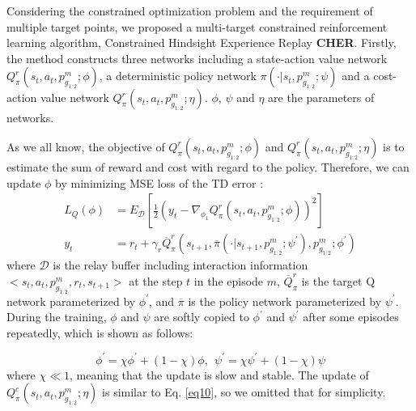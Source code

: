 \documentclass{article}
\begin{document}
Considering the constrained optimization problem and the requirement of multiple target points, we proposed a multi-target constrained reinforcement learning algorithm, Constrained Hindsight Experience Replay \textbf{CHER}. Firstly, the method constructs three networks including a state-action value network $Q^r_\pi(s_t,a_t, p^m_{g_{1:2}};\phi)$, a deterministic policy network $ \pi(\cdot|s_t,p^m_{g_{1:2}};\psi)$ and a cost-action value network $Q^r_\pi(s_t,a_t,p^m_{g_{1:2}};\eta)$. $\phi$, $\psi$  and $\eta$ are the parameters of networks. 

As we all know, the objective of  $Q^r_\pi(s_t,a_t,p^m_{g_{1:2}};\phi)$ and $Q^r_\pi(s_t,a_t,p^m_{g_{1:2}};\eta)$ is to estimate the sum of reward and cost with regard to the policy. Therefore, we can update $\phi$ by minimizing MSE loss of the TD error \cite{lillicrap2015continuous}: 
\begin{equation}
  \label{eq10}
\begin{split}
L_Q(\phi) &= E_{\mathcal D}[\frac{1}{2}(y_t-\nabla_{\phi_1}Q^r_\pi(s_t,a_t,p^m_{g_{1:2}};\phi))^2]\\
y_t &= r_t +\gamma_r \overline{Q}^r_\pi(s_{t+1},\overline{\pi}(\cdot|s_{t+1},p^m_{g_{1:2}};\psi^{\prime}),p^m_{g_{1:2}};\phi^{\prime})
\end{split}
\end{equation}
where $\mathcal D$ is the relay buffer including interaction information $<s_t,a_t,p^m_{g_{1:2}},r_t,s_{t+1}>$ at the step $t$ in the episode $m$,  $\overline{Q}^r_\pi$ is the target Q network parameterized by $\phi^\prime$, and $\overline{\pi}$ is the policy network parameterized by $\psi^\prime$. During the training, $\phi$ and $\psi$ are softly copied to $\phi^\prime$ and $\psi^\prime$ after some episodes repeatedly, which is shown as follows:

\begin{equation}
  \label{eq10-2}
\phi^\prime=\chi\phi^\prime+\left(1-\chi\right)\phi , \ \ \psi^\prime=\chi\psi^\prime+\left(1-\chi\right)\psi
\end{equation}
where $\chi \ll 1$, meaning that the update is slow and stable. The update of $Q^c_\pi(s_t,a_t,p^m_{g_{1:2}};\eta)$  is similar to Eq. \eqref{eq10}, so we omitted that for simplicity.
\end{document}
